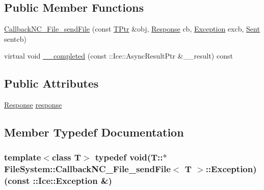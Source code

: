 \subsection*{Public Member Functions}
\begin{DoxyCompactItemize}
\item 
\hyperlink{class_file_system_1_1_callback_n_c___file__send_file_aa900895a968072ca878825b7238a0993}{Callback\+N\+C\+\_\+\+File\+\_\+send\+File} (const \hyperlink{class_file_system_1_1_callback_n_c___file__send_file_a0b4de40be68e6670f4d7d887127adfa1}{T\+Ptr} \&obj, \hyperlink{class_file_system_1_1_callback_n_c___file__send_file_ac2f2e02236bc1e7302a100c796b9d881}{Response} cb, \hyperlink{class_file_system_1_1_callback_n_c___file__send_file_a6b3e46d31e2767255629f84dbdc41de1}{Exception} excb, \hyperlink{class_file_system_1_1_callback_n_c___file__send_file_a64d311bef39e6c24f7294a62ac449373}{Sent} sentcb)
\item 
virtual void \hyperlink{class_file_system_1_1_callback_n_c___file__send_file_a7298a6e4457c053513bdd5320b868980}{\+\_\+\+\_\+completed} (const \+::Ice\+::\+Async\+Result\+Ptr \&\+\_\+\+\_\+result) const 
\end{DoxyCompactItemize}
\subsection*{Public Attributes}
\begin{DoxyCompactItemize}
\item 
\hyperlink{class_file_system_1_1_callback_n_c___file__send_file_ac2f2e02236bc1e7302a100c796b9d881}{Response} \hyperlink{class_file_system_1_1_callback_n_c___file__send_file_a162fe4aa10743079f5dcc3afce72467d}{response}
\end{DoxyCompactItemize}


\subsection{Member Typedef Documentation}
\hypertarget{class_file_system_1_1_callback_n_c___file__send_file_a6b3e46d31e2767255629f84dbdc41de1}{}
\subsubsection[{Exception}]{\setlength{\rightskip}{0pt plus 5cm}template$<$class T$>$ typedef void(T\+::$\ast$ {\bf File\+System\+::\+Callback\+N\+C\+\_\+\+File\+\_\+send\+File}$<$ T $>$\+::Exception) (const \+::Ice\+::\+Exception \&)}\label{class_file_system_1_1_callback_n_c___file__send_file_a6b3e46d31e2767255629f84dbdc41de1}
\hypertarget{class_file_system_1_1_callback_n_c___file__send_file_ac2f2e02236bc1e7302a100c796b9d881}{}
